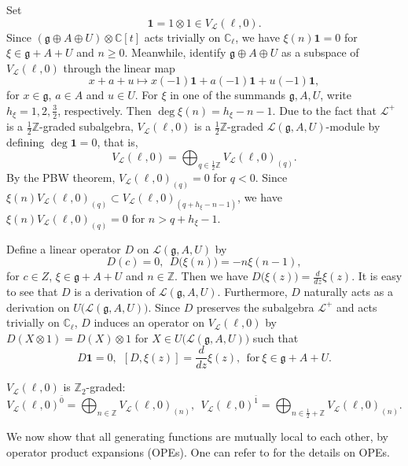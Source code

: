 \documentclass[12pt]{article}
\numberwithin{equation}{section}
\theoremstyle{definition}
\theoremstyle{plain}
\newcommand{\bC}{\ensuremath{\mathbb{C}}}
\newcommand{\bZ}{\ensuremath{\mathbb{Z}}}
\newcommand{\bZz}{\ensuremath{\mathbb{Z}_2}}
\newcommand{\ep}{\ensuremath{{\bar{0}}}}
\newcommand{\op}{\ensuremath{{\bar{1}}}}
\newcommand{\fg}{\mathfrak{g}}
\newcommand{\cL}{\ensuremath{\mathcal{L}}}
\newcommand{\bone}{\mathbf{1 }}
\begin{document}
Set 
\begin{equation*}
    \bone=1\otimes 1\in V_\cL(\ell,0).
\end{equation*}
Since $(\fg\oplus A\oplus U)\otimes\mathbb{C}[t]$ acts trivially on $\mathbb{C}_\ell$, we have $\xi(n)\bone=0$ for $\xi\in \fg+A+U$ and $n\ge0$. Meanwhile, identify $\fg\oplus A\oplus U$ as a subspace of $V_\cL(\ell,0)$ through the linear map
\begin{equation}\label{creation}
    x+a+u\mapsto x(-1)\bone+a(-1)\bone+u(-1)\bone,
\end{equation}
for $x\in\fg$, $a\in A$ and $u\in U$. For $\xi$ in one of the summands $\fg,A,U$, write $h_\xi=1,2,\frac{3}{2}$, respectively. Then $\deg \xi(n)=h_\xi-n-1$. Due to the fact that $\cL^+$ is a $\frac{1}{2}\bZ$-graded subalgebra, $V_\cL(\ell,0)$ is a $\frac{1}{2}\bZ$-graded $\cL(\fg,A,U)$-module by defining $\deg \bone=0$, that is,
\begin{equation*}
    V_\cL(\ell,0)=\bigoplus_{q\in\frac{1}{2}\bZ} V_\cL(\ell,0)_{(q)}.
\end{equation*}
By the PBW theorem, $V_\cL(\ell,0)_{(q)}=0$ for $q<0$. Since $\xi(n)V_\cL(\ell,0)_{(q)}\subset V_\cL(\ell,0)_{(q+h_\xi-n-1)}$, we have $\xi(n)V_\cL(\ell,0)_{(q)}=0$ for $n>q+h_\xi-1$.

Define a linear operator $D$ on $\cL(\fg,A,U)$ by
\begin{equation*}
    D(c)=0,\ \ D\big(\xi(n)\big)=-n\xi(n-1),
\end{equation*}
for $c\in Z$, $\xi\in\fg+A+U$ and $n\in\bZ$. Then we have $D\big(\xi(z)\big)=\frac{d}{dz}\xi(z)$. It is easy to see that $D$ is a derivation of $\cL(\fg,A,U)$. Furthermore, $D$ naturally acts as a derivation on $U\big(\cL(\fg,A,U)\big)$. Since $D$ preserves the subalgebra $\cL^+$ and acts trivially on $\bC_\ell$, $D$ induces an operator on $V_\cL(\ell,0)$ by $D(X\otimes 1)=D(X)\otimes 1$ for $X\in U\big(\cL(\fg,A,U)\big)$ such that
\begin{equation*}
    D\bone=0,\ \ [D,\xi(z)]=\frac{d}{dz}\xi(z),\ \ \text{for}\ \xi\in\fg+A+U.
\end{equation*}

$V_\cL(\ell,0)$ is $\bZz$-graded:
\begin{equation*}
    V_\cL(\ell,0)^\ep=\bigoplus_{n\in\bZ}V_\cL(\ell,0)_{(n)},\ \  V_\cL(\ell,0)^\op=\bigoplus_{n\in\frac{1}{2}+\bZ}V_\cL(\ell,0)_{(n)}.
\end{equation*}

We now show that all generating functions are mutually local to each other, by operator product expansions (OPEs). One can refer to \cite{K98} for the details on OPEs. 
\end{document}
